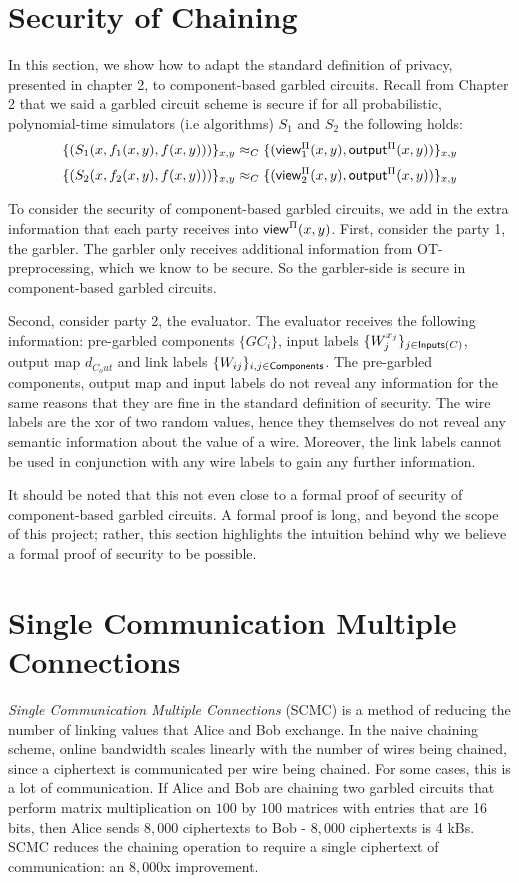 \section{Security of Chaining}

In this section, we show how to adapt the standard definition of privacy, presented in chapter 2, to component-based garbled circuits.
Recall from Chapter 2 that we said a garbled circuit scheme is secure if for all probabilistic, polynomial-time simulators (i.e algorithms) $S_1$ and $S_2$ the following holds:
\begin{equation}
    \{(S_1(x, f_1(x,y), f(x,y)))\}_{x,y} \approx_C \{({\sf view}^{\Pi}_1(x,y), {\sf output}^{\Pi}(x,y)) \}_{x,y}
\end{equation}
\begin{equation}
    \{(S_2(x, f_2(x,y), f(x,y)))\}_{x,y} \approx_C \{({\sf view}^{\Pi}_2(x,y), {\sf output}^{\Pi}(x,y)) \}_{x,y}
\end{equation}

To consider the security of component-based garbled circuits, we add in the extra information that each party receives into ${\sf view}^{\Pi}(x,y)$. 
First, consider the party 1, the garbler. 
The garbler only receives additional information from OT-preprocessing, which we know to be secure. 
So the garbler-side is secure in component-based garbled circuits.

Second, consider party 2, the evaluator. 
The evaluator receives the following information: pre-garbled components $\{GC_i\}$, input labels $\{W_j^{x_j}\}_{j \in \textsf{Inputs}(C)}$, output map $d_{C_out}$ and link labels $\{W_{ij}\}_{i,j \in \textsf{Components}}$.
The pre-garbled components, output map and input labels do not reveal any information for the same reasons that they are fine in the standard definition of security.
The wire labels are the xor of two random values, hence they themselves do not reveal any semantic information about the value of a wire. 
Moreover, the link labels cannot be used in conjunction with any wire labels to gain any further information.

It should be noted that this not even close to a formal proof of security of component-based garbled circuits. 
A formal proof is long, and beyond the scope of this project; rather, this section highlights the intuition behind why we believe a formal proof of security to be possible. 

\section{Single Communication Multiple Connections}
\textit{Single Communication Multiple Connections} (SCMC) is a method of reducing the number of linking values that Alice and Bob exchange.
In the naive chaining scheme, online bandwidth scales linearly with the number of wires being chained, since a ciphertext is communicated per wire being chained.
For some cases, this is a lot of communication.
If Alice and Bob are chaining two garbled circuits that perform matrix multiplication on $100$ by $100$ matrices with entries that are 16 bits, then Alice sends $8,000$ ciphertexts to Bob - $8,000$ ciphertexts is 4 kBs.
SCMC reduces the chaining operation to require a single ciphertext of communication: an $8,000$x improvement.

